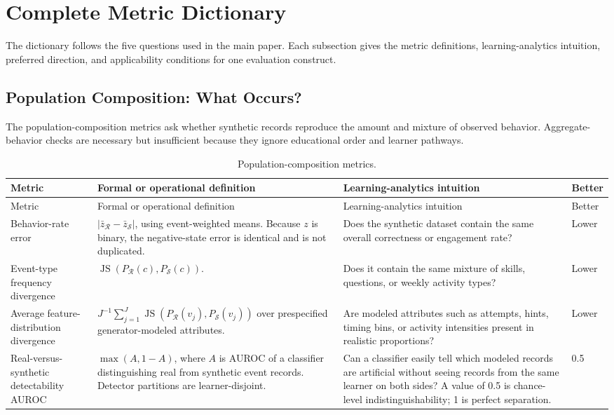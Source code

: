 \documentclass[10pt]{article}
\newcommand{\R}{\mathcal{R}}
\newcommand{\SYN}{\mathcal{S}}
\newcommand{\JS}{\operatorname{JS}}
\begin{document}
\section{Complete Metric Dictionary}
\label{sec:dictionary}

The dictionary follows the five questions used in the main paper. Each subsection gives the metric definitions, learning-analytics intuition, preferred direction, and applicability conditions for one evaluation construct.

\subsection{Population Composition: What Occurs?}

The population-composition metrics ask whether synthetic records reproduce the
amount and mixture of observed behavior. Aggregate-behavior checks are
necessary but insufficient because they ignore educational order and learner
pathways.

\begin{longtable}{@{}p{3.5cm}p{6.1cm}p{5.2cm}p{1.4cm}@{}}
\caption{Population-composition metrics.}\label{tab:supp-dictionary-composition}\\
\toprule
Metric & Formal or operational definition & Learning-analytics intuition & Better \\
\midrule
\endfirsthead
\toprule
Metric & Formal or operational definition & Learning-analytics intuition & Better \\
\midrule
\endhead
\bottomrule
\endlastfoot
Behavior-rate error & \(|\bar z_{\R}-\bar z_{\SYN}|\), using event-weighted means.  Because \(z\) is binary, the negative-state error is identical and is not duplicated. & Does the synthetic dataset contain the same overall correctness or engagement rate? & Lower \\
Event-type frequency divergence & \(\JS(P_{\R}(c),P_{\SYN}(c))\). & Does it contain the same mixture of skills, questions, or weekly activity types? & Lower \\
Average feature-distribution divergence & \(J^{-1}\sum_{j=1}^{J}\JS(P_{\R}(v_j),P_{\SYN}(v_j))\) over prespecified generator-modeled attributes. & Are modeled attributes such as attempts, hints, timing bins, or activity intensities present in realistic proportions? & Lower \\
Real-versus-synthetic detectability AUROC & \(\max(A,1-A)\), where \(A\) is AUROC of a classifier distinguishing real from synthetic event records. Detector partitions are learner-disjoint. & Can a classifier easily tell which modeled records are artificial without seeing records from the same learner on both sides? A value of 0.5 is chance-level indistinguishability; 1 is perfect separation. & 0.5 \\
\end{longtable}
\end{document}
